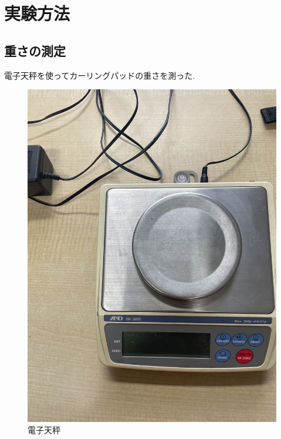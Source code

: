\documentclass[main]{subfiles}
\begin{document}
\chapter{実験方法}
\section{重さの測定}
電子天秤を使ってカーリングパッドの重さを測った.
\begin{figure}[htbp]
    \centering
    \includegraphics[scale=0.2]{figures/denshitenbinn.jpg}
    \caption{電子天秤}
    \label{fig:label}
\end{figure}
\end{document}
